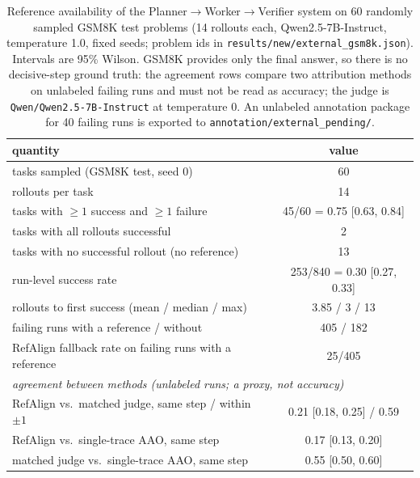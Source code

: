 \begin{table}[t]
\centering\small
\begin{tabular}{lc}
\toprule
quantity & value \\
\midrule
tasks sampled (GSM8K test, seed 0) & 60 \\
rollouts per task & 14 \\
tasks with $\ge 1$ success and $\ge 1$ failure & 45/60 = 0.75 [0.63, 0.84] \\
tasks with all rollouts successful & 2 \\
tasks with no successful rollout (no reference) & 13 \\
run-level success rate & 253/840 = 0.30 [0.27, 0.33] \\
rollouts to first success (mean / median / max) & 3.85 / 3 / 13 \\
failing runs with a reference / without & 405 / 182 \\
RefAlign fallback rate on failing runs with a reference & 25/405 \\
\midrule
\multicolumn{2}{l}{\emph{agreement between methods (unlabeled runs; a proxy, not accuracy)}} \\
RefAlign vs.\ matched judge, same step / within $\pm1$ & 0.21 [0.18, 0.25] / 0.59 \\
RefAlign vs.\ single-trace AAO, same step & 0.17 [0.13, 0.20] \\
matched judge vs.\ single-trace AAO, same step & 0.55 [0.50, 0.60] \\
\bottomrule
\end{tabular}
\caption{Reference availability of the Planner$\to$Worker$\to$Verifier system on 60 randomly
sampled GSM8K test problems (14 rollouts each, Qwen2.5-7B-Instruct, temperature 1.0,
fixed seeds; problem ids in \texttt{results/new/external\_gsm8k.json}). Intervals are 95\% Wilson.
GSM8K provides only the final answer, so there is no decisive-step ground truth: the agreement rows compare
two attribution methods on unlabeled failing runs and must not be read as accuracy; the judge is
\texttt{Qwen/Qwen2.5-7B-Instruct} at temperature 0. An unlabeled annotation package for
40 failing runs is exported to \texttt{annotation/external\_pending/}.}
\label{tab:external-availability-qwen}
\end{table}
